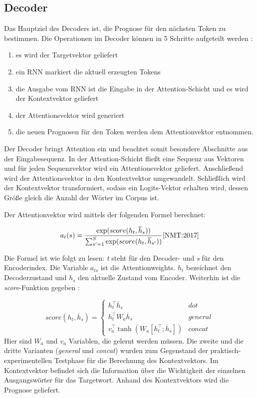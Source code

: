 \subsection{Decoder}
Das Hauptziel des Decoders ist, die Prognose für den nächsten Token zu bestimmen. Die Operationen im Decoder können in 5 Schritte aufgeteilt werden \cite{NMT&ATT:22}:
\begin{enumerate}\label{steps_BNMT}
	\item es wird der Targetvektor geliefert
	\item ein RNN markiert die aktuell erzeugten Tokens
	\item die Ausgabe vom RNN ist die Eingabe in der Attention-Schicht und es wird der Kontextvektor geliefert
	\item der Attentionsvektor wird generiert
	\item die neuen Prognosen für den Token werden dem Attentionvektor entnommen.
\end{enumerate}

Der Decoder bringt Attention ein und beachtet somit besondere Abschnitte aus der Eingabesequenz. In der Attention-Schicht fließt eine Sequenz aus Vektoren und für jeden Sequenzvektor wird ein Attentionsvektor geliefert. Anschließend wird der Attentionsvektor in den Kontextvektor umgewandelt. Schließlich wird der Kontextvektor transformiert, sodass ein Logits-Vektor erhalten wird, dessen Größe gleich die Anzahl der Wörter im Corpus ist.

Der Attentionvektor wird mittels der folgenden Formel berechnet:

\begin{equation}
	a_{t}(s) = \frac{\exp(score(h_t, \overline{h}_s))}{\sum^{S}_{s'=1} \exp(score(h_t, \overline{h}_{s'})) } \cite{NMT:2017}
\end{equation}

Die Formel ist wie folgt zu lesen: \textit{t} steht für den Decoder- und \textit{s} für den Encoderindex. Die Variable $a_{ts}$ ist die Attentionweights. $h_t$ bezeichnet den Decoderzustand und $h_s$ den aktuelle Zustand vom Encoder. Weiterhin ist die \textit{score}-Funktion gegeben \cite{NMT:2017}:

\begin{equation} \label{score_func}
	score(h_t, \overline{h}_s) = 
	\begin{cases}
		h_t^\top \overline{h}_s & \textit{dot} \\
		h_t^\top W_a \overline{h}_s & \textit{general} \\
		v_a^\top \tanh(W_a[h_t^\top;\overline{h}_s]) & \textit{concat}
	\end{cases}
\end{equation}
Hier sind $W_a$ und $v_a$ Variablen, die gelernt werden müssen. Die zweite und die dritte Varianten (\textit{general} und \textit{concat}) wurden zum Gegenstand der praktisch-experimentellen Testphase für die Berechnung des Kontextvektors. Im Kontextvektor befindet sich die Information über die Wichtigkeit der einzelnen Ausgangswörter für das Targetwort. Anhand des Kontextvektors wird die Prognose geliefert.

